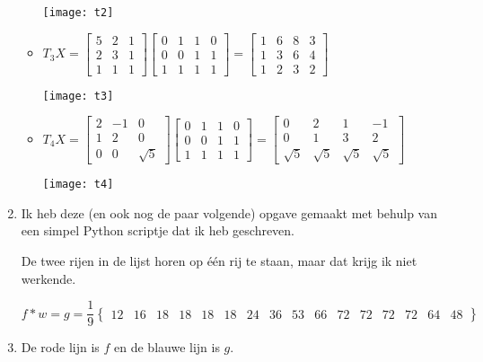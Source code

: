 \documentclass{article}
\begin{document}
\begin{enumerate}
\begin{itemize}
\texttt{[image: t2]}

\item $ T_3 X = \begin{bmatrix}
5 & 2 & 1 \\
2 & 3 & 1 \\
1 & 1 & 1
\end{bmatrix} \begin{bmatrix}
0 & 1 & 1 & 0 \\
0 & 0 & 1 & 1 \\
1 & 1 & 1 & 1
\end{bmatrix} = \begin{bmatrix}
1 & 6 & 8 & 3 \\
1 & 3 & 6 & 4 \\
1 & 2 & 3 & 2
\end{bmatrix} $

\texttt{[image: t3]}

\item $ T_4 X = \begin{bmatrix}
2 & -1 & 0 \\
1 & 2 & 0 \\
0 & 0 & \sqrt{5}
\end{bmatrix} \begin{bmatrix}
0 & 1 & 1 & 0 \\
0 & 0 & 1 & 1 \\
1 & 1 & 1 & 1
\end{bmatrix} = \begin{bmatrix}
0 & 2 & 1 & -1 \\
0 & 1 & 3 & 2 \\
\sqrt{5} & \sqrt{5} & \sqrt{5} & \sqrt{5}
\end{bmatrix} $

\texttt{[image: t4]}

\end{itemize}

\item Ik heb deze (en ook nog de paar volgende) opgave gemaakt met behulp van
een simpel Python scriptje dat ik heb geschreven.

De twee rijen in de lijst horen op \'e\'en rij te staan, maar dat krijg ik niet
werkende.

$$ f * w = g = \frac{1}{9} \begin{Bmatrix} 12 & 16 & 18 & 18 & 18 & 18 & 24 &
36 & 53 & 66 & 72 & 72 & 72 & 72 & 64 & 48 \end{Bmatrix} $$

\item De rode lijn is $ f $ en de blauwe lijn is $ g $.


\end{enumerate}
\end{document}
